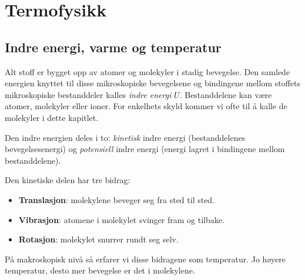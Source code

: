 \chapter{Termofysikk}
\label{Chapter:termofysikk}


\newpage

\section{Indre energi, varme og temperatur}

Alt stoff er bygget opp av atomer og molekyler i stadig bevegelse. Den samlede energien knyttet til disse mikroskopiske bevegelsene og bindingene mellom stoffets mikroskopiske bestanddeler kalles \emph{indre energi} $U$. Bestanddelene kan være atomer, molekyler eller ioner. For enkelhets skyld kommer vi ofte til å kalle de molekyler i dette kapitlet.

Den indre energien deles i to: \emph{kinetisk} indre energi (bestanddelenes bevegelsesenergi) og \emph{potensiell} indre energi (energi lagret i bindingene mellom bestanddelene).

Den kinetiske delen har tre bidrag:
\begin{itemize}
  \item \textbf{Translasjon}: molekylene beveger seg fra sted til sted. 
  \item \textbf{Vibrasjon}: atomene i molekylet svinger fram og tilbake.
  \item \textbf{Rotasjon}: molekylet snurrer rundt seg selv.
\end{itemize}
På makroskopisk nivå så erfarer vi disse bidragene som temperatur. Jo høyere temperatur, desto mer bevegelse er det i molekylene.

